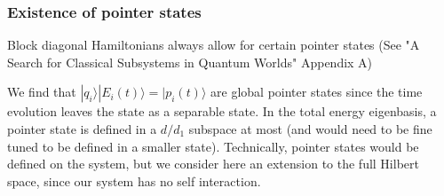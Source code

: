 \documentclass{article}
\begin{document}
\subsubsection{Existence of pointer states}
Block diagonal Hamiltonians always allow for certain pointer states (See "A Search for Classical Subsystems in Quantum Worlds" Appendix A)\\

\begin{comment}
(Question, could we find one who's entanglement is not zero, but stays constant??? is it the case for a superposition of pointer states here? pointer stats on diff qi's??)
Thinking about it, that would be a state such that the off diagonal terms are non-zero and dont really vary in time.
or a state that cant be written as a separable pure state (ie superposition of 2 such state for ex) but where the relative weights of the 2 separable states stay the same. I think we can essentially express entanglement as a function of the relative weight of the 2 Schmidt states. if one dominates, then low entanglement, if they share weights pretty well then high entrop.
\end{comment}
We find that $|q_i\rangle|E_i(t)\rangle = |p_i(t)\rangle$ are global pointer states since the time evolution leaves the state as a separable state. In the total energy eigenbasis, a pointer state is defined in a $d/d_1$ subspace at most (and would need to be fine tuned to be defined in a smaller state). Technically, pointer states would be defined on the system, but we consider here an extension to the full Hilbert space, since our system has no self interaction.\\
\end{document}
